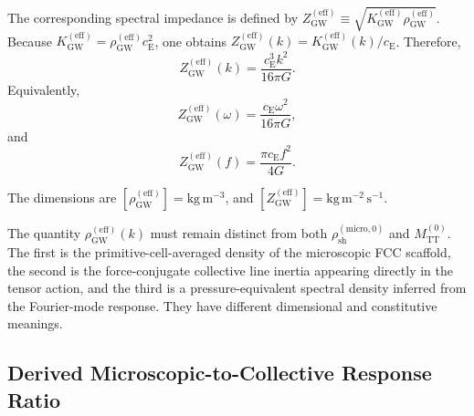 The corresponding spectral impedance is defined by $Z_{\mathrm{GW}}^{(\mathrm{eff})} \equiv \sqrt{ K_{\mathrm{GW}}^{(\mathrm{eff})} \rho_{\mathrm{GW}}^{(\mathrm{eff})} }$. Because $K_{\mathrm{GW}}^{(\mathrm{eff})} = \rho_{\mathrm{GW}}^{(\mathrm{eff})} c_{\mathrm{E}}^{2}$, one obtains $Z_{\mathrm{GW}}^{(\mathrm{eff})}(k) = K_{\mathrm{GW}}^{(\mathrm{eff})}(k)/c_{\mathrm{E}}$. Therefore,
\begin{equation}
    Z_{\mathrm{GW}}^{(\mathrm{eff})}(k) = \frac{c_{\mathrm{E}}^{3}k^{2}}{16\pi G}.
    \label{eq:n7_effective_impedance_k}
\end{equation}
Equivalently,
\begin{equation}
    Z_{\mathrm{GW}}^{(\mathrm{eff})}(\omega) = \frac{c_{\mathrm{E}}\omega^{2}}{16\pi G},
    \label{eq:n7_effective_impedance_omega}
\end{equation}
and
\begin{equation}
    Z_{\mathrm{GW}}^{(\mathrm{eff})}(f) = \frac{\pi c_{\mathrm{E}}f^{2}}{4G}.
    \label{eq:n7_effective_impedance_f}
\end{equation}

The dimensions are $[\rho_{\mathrm{GW}}^{(\mathrm{eff})}] = \mathrm{kg\,m^{-3}}$, and $[Z_{\mathrm{GW}}^{(\mathrm{eff})}] = \mathrm{kg\,m^{-2}\,s^{-1}}$.

The quantity $\rho_{\mathrm{GW}}^{(\mathrm{eff})}(k)$ must remain distinct from both $\rho_{\mathrm{sh}}^{(\mathrm{micro},0)}$ and $M_{\mathrm{TT}}^{(0)}$. The first is the primitive-cell-averaged density of the microscopic FCC scaffold, the second is the force-conjugate collective line inertia appearing directly in the tensor action, and the third is a pressure-equivalent spectral density inferred from the Fourier-mode response. They have different dimensional and constitutive meanings.

\subsection{Derived Microscopic-to-Collective Response Ratio}
\label{subsec:n7_derived_zeta}

